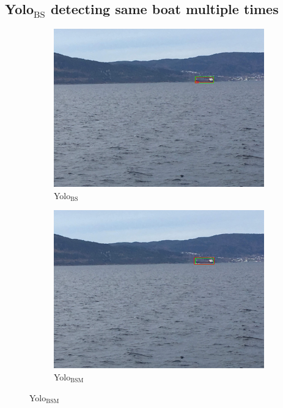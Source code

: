 \subsection{Yolo$_{\text{BS}}$ detecting same boat multiple times}
\label{sec:yolo1_multidetect}
\begin{figure}[h!]
\begin{subfigure}{.5\textwidth}
  \centering
  \includegraphics[width=0.8\linewidth]{results/case_tr_moor/yolo12/yolo1/2better/IMG_2365.jpg}
  \caption{Yolo$_{\text{BS}}$}
\end{subfigure}%
\begin{subfigure}{.5\textwidth}
  \centering
  \includegraphics[width=.8\linewidth]{results/case_tr_moor/yolo12/yolo2/2better/IMG_2365.jpg}
  \caption{Yolo$_{\text{BSM}}$}
\end{subfigure}


\end{figure}
